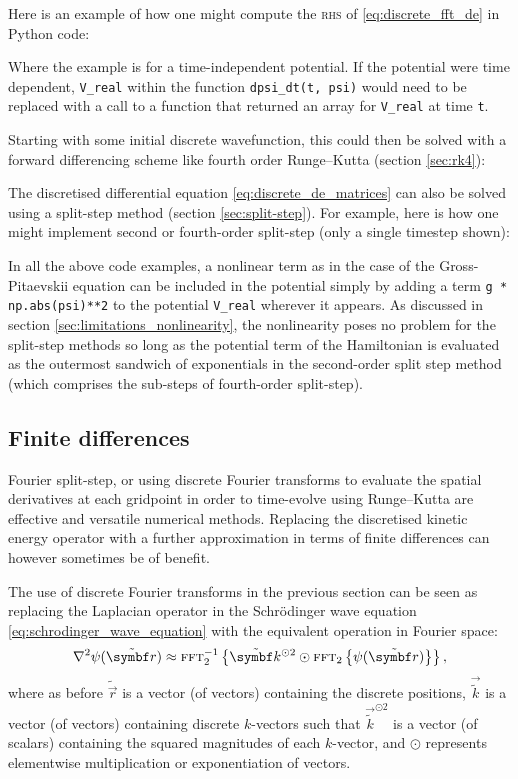 Here is an example of how one might compute the \textsc{rhs} of \eqref{eq:discrete_fft_de} in Python code:


Where the example is for a time-independent potential. If the potential were time dependent, \texttt{V\_real} within the function \texttt{dpsi\_dt(t, psi)} would need to be replaced with a call to a function that returned an array for \texttt{V\_real} at time \texttt{t}.

Starting with some initial discrete wavefunction, this could then be solved with a forward differencing scheme like fourth order Runge--Kutta (section \ref{sec:rk4}):


The discretised differential equation \eqref{eq:discrete_de_matrices} can also be solved using a split-step method (section \ref{sec:split-step}). For example, here is how one might implement second or fourth-order split-step (only a single timestep shown):


In all the above code examples, a nonlinear term as in the case of the Gross-Pitaevskii equation can be included in the potential simply by adding a term \texttt{g * np.abs(psi)**2} to the potential \texttt{V\_real} wherever it appears. As discussed in section \ref{sec:limitations_nonlinearity}, the nonlinearity poses no problem for the split-step methods so long as the potential term of the Hamiltonian is evaluated as the outermost sandwich of exponentials in the second-order split step method (which comprises the sub-steps of fourth-order split-step).

\subsection{Finite differences}
Fourier split-step, or using discrete Fourier transforms to evaluate the spatial derivatives at each gridpoint in order to time-evolve using Runge--Kutta are effective and versatile numerical methods. Replacing the discretised kinetic energy operator with a further approximation in terms of finite differences can however sometimes be of benefit.

The use of discrete Fourier transforms in the previous section can be seen as replacing the Laplacian operator in the Schr\"odinger wave equation \eqref{eq:schrodinger_wave_equation} with the equivalent operation in Fourier space:
\begin{align}\label{eq:dft_laplacian}
\nabla^2\psi(\tilde{\vec r}) \approx \fft_2^{-1}\left\{\tilde{\vec k}^{\odot 2} \odot \fft_2\left\{\psi(\tilde{\vec r})\right\}\right\},
\end{align}
where as before $\tilde{\vec r}$ is a vector (of vectors) containing the discrete positions, $\vec{\tilde k}$ is a vector (of vectors) containing discrete $k$-vectors such that $\vec{\tilde k}^{\odot 2}$ is a vector (of scalars) containing the squared magnitudes of each $k$-vector, and $\odot$ represents elementwise multiplication or exponentiation of vectors.

